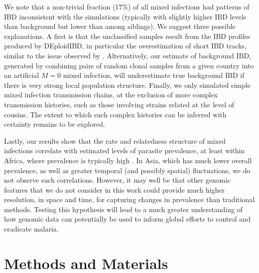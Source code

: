 \documentclass[9pt,lineno]{elife}
\begin{document}
We note that a non-trivial fraction (17\%) of all mixed infections had patterns of IBD inconsistent with the simulations (typically with slightly higher IBD levels than background but lower than among siblings).  We suggest three possible explanations.  A first is that the unclassified samples result from the IBD profiles produced by DEploidIBD, in particular the overestimation of short IBD tracks, similar to the issue observed by \citep{Wong2018}. Alternatively, our estimate of background IBD, generated by combining pairs of random clonal samples from a given country into an artificial $M=0$ mixed infection, will underestimate true background IBD if there is very strong local population structure. Finally, we only simulated simple mixed infection transmission chains, at the exclusion of more complex transmission histories, such as those involving strains related at the level of cousins. The extent to which such complex histories can be inferred with certainty remains to be explored.

Lastly, our results show that the rate and relatedness structure of mixed infections correlate with estimated levels of parasite prevalence, at least within Africa, where prevalence is typically high \citep{SMITH199355}.  In Asia, which has much lower overall prevalence, as well as greater temporal (and possibly spatial) fluctuations, we do not observe such correlations. However, it may well be that other genomic features that we do not consider in this work could provide much higher resolution, in space and time, for capturing changes in prevalence than traditional methods. Testing this hypothesis will lead to a much greater understanding of how genomic data can potentially be used to inform global efforts to control and eradicate malaria.


\section{Methods and Materials}
\end{document}
